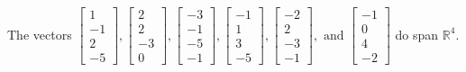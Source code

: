 \begin{exercise}
\begin{exerciseStatement}
  \end{exerciseStatement}
  \begin{exerciseAnswer}
   The vectors \(\left[\begin{array}{r}
1 \\
-1 \\
2 \\
-5
\end{array}\right] , \left[\begin{array}{r}
2 \\
2 \\
-3 \\
0
\end{array}\right] , \left[\begin{array}{r}
-3 \\
-1 \\
-5 \\
-1
\end{array}\right] , \left[\begin{array}{r}
-1 \\
1 \\
3 \\
-5
\end{array}\right] , \left[\begin{array}{r}
-2 \\
2 \\
-3 \\
-1
\end{array}\right] , \text{ and } \left[\begin{array}{r}
-1 \\
0 \\
4 \\
-2
\end{array}\right]\) 
  	 do  
	span \(\mathbb{R}^4\).
  


  \end{exerciseAnswer}
\end{exercise}